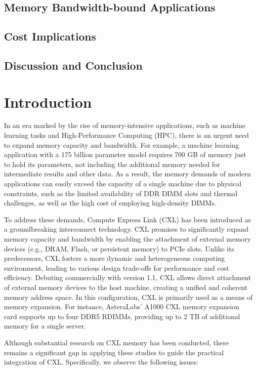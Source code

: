 \subsection{Memory Bandwidth-bound Applications}

\subsection{Cost Implications}

\subsection{Discussion and Conclusion}

\section{Introduction}

In an era marked by the rise of memory-intensive applications, such as machine learning tasks and High-Performance Computing (HPC), there is an urgent need to expand memory capacity and bandwidth. For example, a machine learning application with a 175 billion parameter model requires 700 GB of memory just to hold its parameters, not including the additional memory needed for intermediate results and other data. As a result, the memory demands of modern applications can easily exceed the capacity of a single machine due to physical constraints, such as the limited availability of DDR DIMM slots and thermal challenges, as well as the high cost of employing high-density DIMMs.

To address these demands, Compute Express Link (CXL) has been introduced as a groundbreaking interconnect technology. CXL promises to significantly expand memory capacity and bandwidth by enabling the attachment of external memory devices (e.g., DRAM, Flash, or persistent memory) to PCIe slots. Unlike its predecessors, CXL fosters a more dynamic and heterogeneous computing environment, leading to various design trade-offs for performance and cost efficiency. Debuting commercially with version 1.1, CXL allows direct attachment of external memory devices to the host machine, creating a unified and coherent memory address space. In this configuration, CXL is primarily used as a means of memory expansion. For instance, AsteraLabs' A1000 CXL memory expansion card supports up to four DDR5 RDIMMs, providing up to 2 TB of additional memory for a single server.

Although substantial research on CXL memory has been conducted, there remains a significant gap in applying these studies to guide the practical integration of CXL. Specifically, we observe the following issues:

